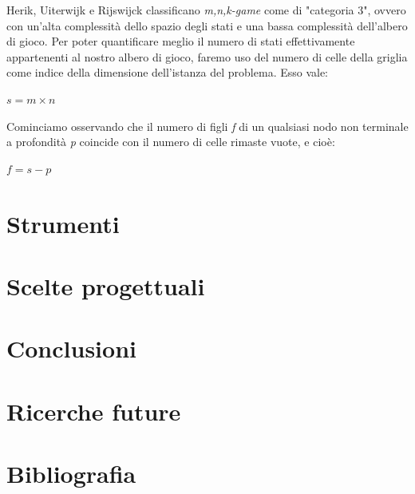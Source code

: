 \documentclass{article}
\begin{document}
Herik, Uiterwijk e Rijswijck classificano \emph{m,n,k-game} come di "categoria
3", ovvero con un'alta complessità dello spazio degli stati e una bassa
complessità dell'albero di gioco. Per poter quantificare meglio il numero di
stati effettivamente appartenenti al nostro albero di gioco, faremo uso del
numero di celle della griglia come indice della dimensione dell'istanza del
problema. Esso vale:

\begin{center}
  $s = m \times n$
\end{center}

Cominciamo osservando che il numero di figli \emph{f} di un qualsiasi nodo non
terminale a profondità \emph{p} coincide con il numero di celle rimaste vuote,
e cioè:

\begin{center}
  $f = s - p$
\end{center}




\section{Strumenti}

\section{Scelte progettuali}

\section{Conclusioni}

\section{Ricerche future}

\section{Bibliografia}
\end{document}
